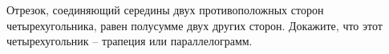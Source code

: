 \begin{ex}
	\begin{condition}
		Отрезок, соединяющий середины двух противоположных сторон четырехугольника, равен полусумме двух других сторон. Докажите, что этот четырехугольник – трапеция или параллелограмм.
	\end{condition}
\end{ex}